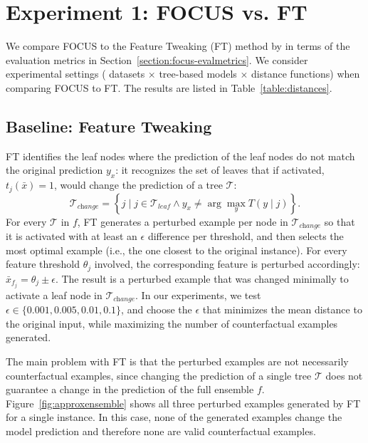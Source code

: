 
\section{Experiment 1: FOCUS vs. FT}
\label{section:experiment1}



We compare FOCUS to the Feature Tweaking (FT) method by \citet{tolomei_interpretable_2017} in terms of the evaluation metrics in Section~\ref{section:focus-evalmetrics}. 
We consider  experimental settings ( datasets $\times$  tree-based models $\times$  distance functions) when comparing FOCUS to FT. 
The results are listed in Table~\ref{table:distances}. 

\subsection{Baseline: Feature Tweaking}
\label{section:baselineft}
FT identifies the leaf nodes where the prediction of the leaf nodes do not match the original prediction $y_x$: it recognizes the set of leaves that if activated, $t_j(\bar{x}) = 1$, would change the prediction of a tree $\mathcal{T}$:
\begin{equation}
\mathcal{T}_\textit{change} = \left\{ j \mid j \in   \mathcal{T}_\textit{leaf} \land y_x \not = \arg \max_y T(y\mid j) \right\}.
\end{equation}
For every $\mathcal{T}$ in $f$, FT generates a perturbed example per node in $\mathcal{T}_\textit{change}$ so that it is activated with at least an $\epsilon$ difference per threshold, and then selects the most optimal example (i.e., the one closest to the original instance).
For every feature threshold $\theta_j$ involved, the corresponding feature is perturbed accordingly: $\bar{x}_{f_j} = \theta_j \pm \epsilon$.
The result is a perturbed example that was changed minimally to activate a leaf node in $\mathcal{T}_\textit{change}$. 
In our experiments, we test $\epsilon \in \{0.001, 0.005, 0.01, 0.1\}$, and choose the $\epsilon$ that minimizes the mean distance to the original input, while maximizing the number of counterfactual examples generated. 


The main problem with FT is that the perturbed examples are not necessarily counterfactual examples, since changing the prediction of a single tree $\mathcal{T}$ does not guarantee a change in the prediction of the full ensemble $f$.
Figure~\ref{fig:approxensemble} shows all three perturbed examples generated by FT for a single instance. 
In this case, none of the generated examples change the model prediction and therefore none are valid counterfactual examples. 

